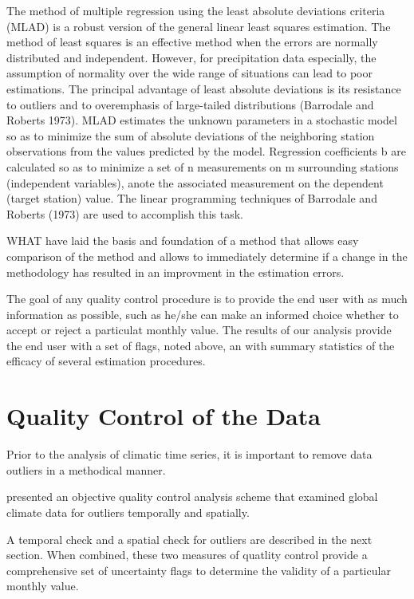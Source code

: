 \documentclass[WHATMANUAL.tex]{subfiles}
\begin{document}
The method of multiple regression using the least absolute deviations criteria (MLAD) is a robust version
of the general linear least squares estimation. The method of least squares is an effective method when the errors are normally distributed and independent. However, for precipitation data especially, the assumption of normality over the wide range of situations can lead to poor estimations. The principal advantage of least absolute deviations is its resistance to outliers and to overemphasis of large-tailed distributions (Barrodale and Roberts 1973). MLAD estimates the unknown parameters in a stochastic model so as to minimize the sum of absolute deviations of the neighboring station observations from the values predicted by the model. Regression coefficients b are calculated so as to minimize a set of n measurements on m surrounding stations (independent variables), anote the associated measurement on the dependent (target station) value. The linear programming techniques of Barrodale and Roberts (1973) are used to accomplish this task.

WHAT have laid the basis and foundation of a method that allows easy comparison of the method and allows to immediately determine if a change in the methodology has resulted in an improvment in the estimation errors.

The goal of any quality control procedure is to provide the end user with as much information as possible, such as he/she can make an informed choice whether to accept or reject a particulat monthly value. The results of our analysis provide the end user with a set of flags, noted above, an with summary statistics of the efficacy of several estimation procedures.

\section{Quality Control of the Data}

Prior to the analysis of climatic time series, it is important to remove data outliers in a methodical manner.

\cite{eischeid_quality_1995} presented an objective quality control analysis scheme that examined global climate data for outliers temporally and spatially.

A temporal check and a spatial check for outliers are described in the next section. When combined, these two measures of quatlity control provide a comprehensive set of uncertainty flags to determine the validity of a particular monthly value.
\end{document}
